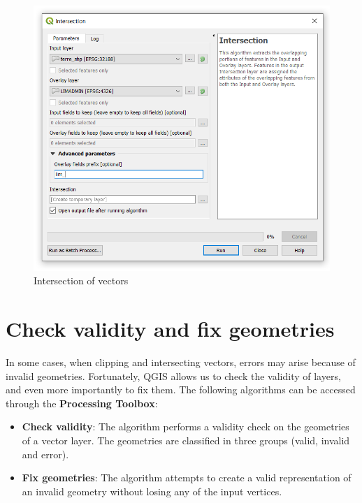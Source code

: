 \documentclass[]{book}
\providecommand{\tightlist}{%
  \setlength{\itemsep}{0pt}\setlength{\parskip}{0pt}}
\theoremstyle{definition}
\theoremstyle{definition}
\theoremstyle{definition}
\theoremstyle{remark}
\begin{document}
\begin{figure}

{\centering \includegraphics[width=10.5in]{figures/Intersecting_Vectors_Dialog} 

}

\caption{Intersection of vectors}\label{fig:unnamed-chunk-21}
\end{figure}

\section{Check validity and fix
geometries}\label{check-validity-and-fix-geometries}

In some cases, when clipping and intersecting vectors, errors may arise
because of invalid geometries. Fortunately, QGIS allows us to check the
validity of layers, and even more importantly to fix them. The following
algorithms can be accessed through the \textbf{Processing Toolbox}:

\begin{itemize}
\tightlist
\item
  \textbf{Check validity}: The algorithm performs a validity check on
  the geometries of a vector layer. The geometries are classified in
  three groups (valid, invalid and error).
\item
  \textbf{Fix geometries}: The algorithm attempts to create a valid
  representation of an invalid geometry without losing any of the input
  vertices.
\end{itemize}
\end{document}
